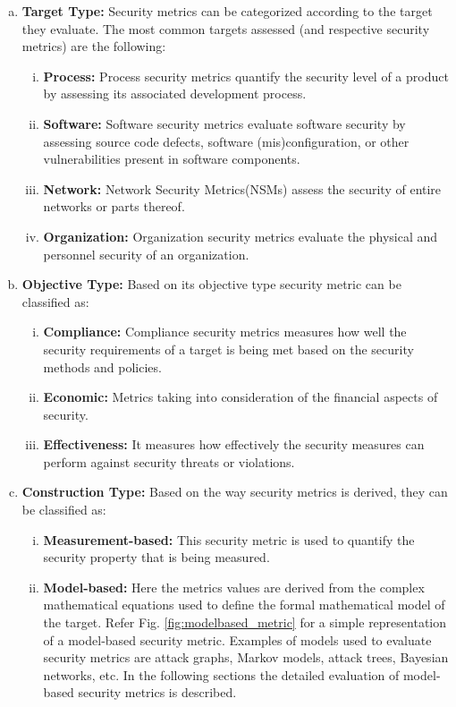 \documentclass[pdftex,english,oribibl]{llncs}
\begin{document}
\begin{enumerate}[(a)]
	\item {\textbf{Target Type:} Security metrics can be categorized according to the target they evaluate. The most common targets assessed (and respective security metrics) are the following:}
	\begin{enumerate}[(i)]
		\item {\textbf{Process:} Process security metrics quantify the security level of a product by assessing its associated development process.}
		\item {\textbf{Software:} Software security metrics evaluate software security by assessing source code defects, software (mis)configuration, or other vulnerabilities present in software components.}
		\item {\textbf{Network:} Network Security Metrics(NSMs) assess the security of entire networks or parts thereof.}
		\item {\textbf{Organization:} Organization security metrics evaluate the physical and personnel security of an organization.}
	\end{enumerate}

	\item {\textbf{Objective Type:} Based on its objective type security metric can be classified as:}
	\begin{enumerate}[(i)]
	\item {\textbf{Compliance:} Compliance security metrics measures how well the security requirements of a target is being met based on the security methods and policies.}
	\item {\textbf{Economic:} Metrics taking into consideration of the financial aspects of security.}
	\item {\textbf{Effectiveness:} It measures how effectively the security measures can perform against security threats or violations.}
	\end{enumerate}

	\item {\textbf{Construction Type:} Based on the way security metrics is derived, they can be classified as:}
	\begin{enumerate}[(i)]
	\item {\textbf{Measurement-based:} This security metric is used to quantify the security property that is being measured.}
	\item {\textbf{Model-based:} Here the metrics values are derived from the complex mathematical equations used to define the formal mathematical model of the target. Refer Fig. \ref{fig:modelbased_metric} for a simple representation of a model-based security metric. Examples of models used to evaluate security metrics are attack graphs, Markov models, attack trees, Bayesian networks, etc. In the following sections the detailed evaluation of model-based security metrics is described.}


\end{enumerate}
\end{enumerate}
\end{document}
